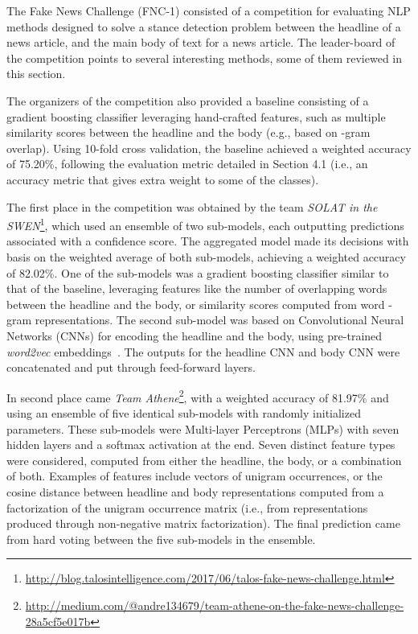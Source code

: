 The Fake News Challenge (FNC-1) consisted of a competition for evaluating NLP methods designed to solve a stance detection problem between the headline of a news article, and the main body of text for a news article. The leader-board of the competition points to several interesting methods, some of them reviewed in this section. 

The organizers of the competition also provided a baseline consisting of a gradient boosting classifier leveraging hand-crafted features, such as multiple similarity scores between the headline and the body (e.g., based on -gram overlap). Using 10-fold cross validation, the baseline achieved a weighted accuracy of 75.20\%, following the evaluation metric detailed in Section 4.1 (i.e., an accuracy metric that gives extra weight to some of the classes). 

The first place in the competition was obtained by the team \textit{SOLAT in the SWEN}\footnote{\scriptsize{\url{http://blog.talosintelligence.com/2017/06/talos-fake-news-challenge.html}}}, which used an ensemble of two sub-models, each outputting predictions associated with a confidence score. The aggregated model made its decisions with basis on the weighted average of both sub-models, achieving a weighted accuracy of 82.02\%. One of the sub-models was a gradient boosting classifier similar to that of the baseline, leveraging features like the number of overlapping words between the headline and the body, or similarity scores computed from word -gram representations. The second sub-model was based on Convolutional Neural Networks (CNNs) for encoding the headline and the body, using pre-trained \textit{word2vec} embeddings~\cite{word2vec}. The outputs for the headline CNN and body CNN were concatenated and put through feed-forward layers. 

In second place came \textit{Team Athene}\footnote{\scriptsize{\url{http://medium.com/@andre134679/team-athene-on-the-fake-news-challenge-28a5cf5e017b}}}, with a weighted accuracy of 81.97\% and using an ensemble of five identical sub-models with randomly initialized parameters. These sub-models were Multi-layer Perceptrons (MLPs) with seven hidden layers and a softmax activation at the end. Seven distinct feature types were considered, computed from either the headline, the body, or a combination of both. Examples of features include vectors of unigram occurrences, or the cosine distance between headline and body representations computed from a factorization of the unigram occurrence matrix (i.e., from representations produced through non-negative matrix factorization). The final prediction came from hard voting between the five sub-models in the ensemble.

